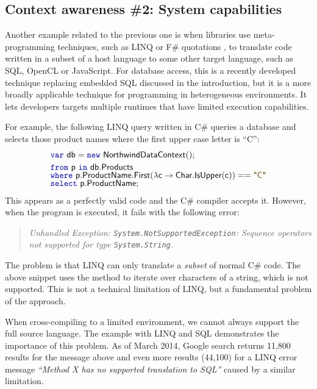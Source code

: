 
\subsection{Context awareness \#2: System capabilities}

Another example related to the previous one is when libraries use meta-programming techniques,
such as LINQ \cite{app-linq,app-linq-essence} or F\# quotations \cite{app-fsharp-metaprog}, to
translate code written in a subset of a host language to some other target language, such as SQL,
OpenCL or JavaScript. For database access, this is a recently developed technique replacing embedded
SQL discussed in the introduction, but it is a more broadly applicable technique for programming
in heterogeneous environments. It lets developers targets multiple runtimes that have limited
execution capabilities.

For example, the following LINQ query written in C\# queries a database and
selects those product names where the first upper case letter is ``C'':
%
\begin{equation*}
\begin{array}{l}
\kvd{var}~\ident{db} = \kvd{new}~\ident{NorthwindDataContext}();\\[0.25em]
\kvd{from}~\ident{p}~\kvd{in}~\ident{db.Products}\\[-0.25em]
\kvd{where}~\ident{p.ProductName.First}(\lambda \ident{c} \rightarrow \ident{Char.IsUpper}(\ident{c})) == \str{C}\\[-0.25em]
\kvd{select}~\ident{p.ProductName};
\end{array}
\end{equation*}
%
This appears as a perfectly valid code and the C\# compiler accepts it. However, when the program
is executed, it fails with the following error:
%
\begin{quote}
\emph{Unhandled Exception: \texttt{System.NotSupportedException}: Sequence operators
not supported for type \texttt{System.String}.}
\end{quote}
%
The problem is that LINQ can only translate a \emph{subset} of normal C\# code. The above snippet
uses the  method to iterate over characters of a string, which is not supported. This is
not a technical limitation of LINQ, but a fundamental problem of the approach.

When cross-compiling to a limited environment, we cannot always support the full source language.
The example with LINQ and SQL demonstrates the importance of this problem. As of March 2014,
Google search returns 11,800 results for the message above and even more results (44,100) for a
LINQ error message \emph{``Method X has no supported translation to SQL''} caused by a similar
limitation.

